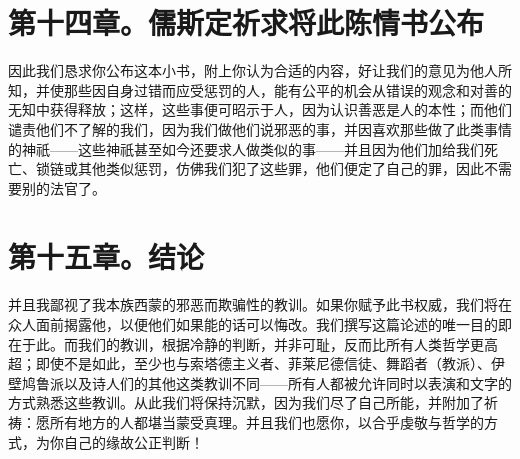 
\section{第十四章。儒斯定祈求将此陈情书公布}

因此我们恳求你公布这本小书，附上你认为合适的内容，好让我们的意见为他人所知，并使那些因自身过错而应受惩罚的人，能有公平的机会从错误的观念和对善的无知中获得释放；这样，这些事便可昭示于人，因为认识善恶是人的本性；而他们谴责他们不了解的我们，因为我们做他们说邪恶的事，并因喜欢那些做了此类事情的神祇——这些神祇甚至如今还要求人做类似的事——并且因为他们加给我们死亡、锁链或其他类似惩罚，仿佛我们犯了这些罪，他们便定了自己的罪，因此不需要别的法官了。\par


\section{第十五章。结论}

并且我鄙视了我本族西蒙的邪恶而欺骗性的教训。如果你赋予此书权威，我们将在众人面前揭露他，以便他们如果能的话可以悔改。我们撰写这篇论述的唯一目的即在于此。而我们的教训，根据冷静的判断，并非可耻，反而比所有人类哲学更高超；即使不是如此，至少也与索塔德主义者、菲莱尼德信徒、舞蹈者（教派）、伊壁鸠鲁派以及诗人们的其他这类教训不同——所有人都被允许同时以表演和文字的方式熟悉这些教训。从此我们将保持沉默，因为我们尽了自己所能，并附加了祈祷：愿所有地方的人都堪当蒙受真理。并且我们也愿你，以合乎虔敬与哲学的方式，为你自己的缘故公正判断！\par

